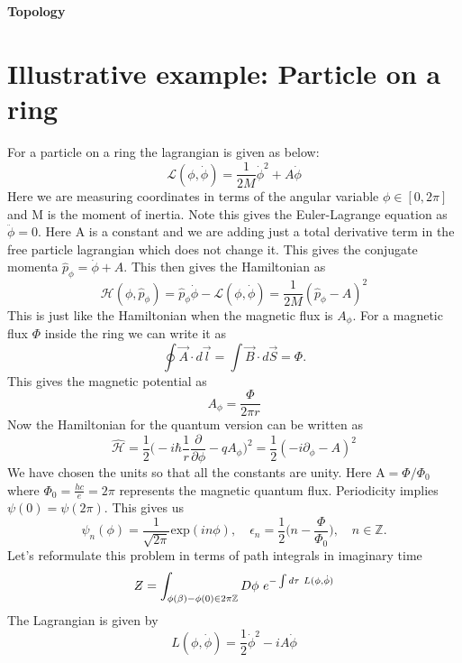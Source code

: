 \documentclass[a4paper, 12pt]{article}
\newcommand{\Zstroke}{%
  \text{\ooalign{\hidewidth\raisebox{0.2ex}{--}\hidewidth\cr$Z$\cr}}%
}
\begin{document}
\begin{center} 
{\Huge{\textbf{Topology}}}\\
\end{center}

\section {Illustrative example: Particle on a ring}
For a particle on a ring the lagrangian is given as below:
\begin{equation}
\mathcal{L}(\phi,\dot{\phi}) = \frac{1}{2M}\dot{\phi}^2 + A\dot{\phi}
\end{equation}
Here we are measuring coordinates in terms of the angular variable $\phi \in [0, 2\pi]$ and M is the moment of inertia. Note this gives the Euler-Lagrange equation as $\ddot{\phi}=0$. Here A is a constant and we are adding just a total derivative term in the free particle lagrangian which does not change it. This gives the conjugate momenta $\hat{p}_{\phi} = \dot{\phi} + A$.  This then gives the Hamiltonian as
\begin{equation}
\mathcal{H}(\phi,\hat{p}_{\phi}) =  \hat{p}_{\phi}\dot{\phi}- \mathcal{L}(\phi,\dot{\phi}) = \frac{1}{2M}(\hat{p}_{\phi} - A)^2
\end{equation}
This is just like the Hamiltonian when the magnetic flux is $A_{\phi}$. For a magnetic flux $\Phi$ inside the ring we can write it as
\begin{equation}
\oint \vec{A} \cdot d\vec{l}=\int \vec{B}\cdot d\vec{S} = \Phi .
\end{equation}
This gives the magnetic potential as
\begin{equation}
A_{\phi} = \frac{\Phi}{2\pi r}
\end{equation}
Now the Hamiltonian for the quantum version can be written as
\begin{equation}
\hat{\mathcal{H}}  = \frac{1}{2}\bigg(-i\hbar\frac{1}{r} \frac{\partial}{\partial\phi}-qA_{\phi} \bigg)^2 = \frac{1}{2}(-i\partial_{\phi}-A)^2 
\end{equation}
We have chosen the units so that all the constants are unity. Here A$= \Phi/\Phi_0$ where $\Phi_0 = \frac{hc}{e} = 2\pi$ represents the magnetic quantum flux. Periodicity implies $\psi(0) = \psi(2\pi)$. This gives us
\begin{equation}
\psi_n(\phi) = \frac{1}{\sqrt{2\pi}}\textrm{exp}(in\phi), \quad \epsilon_n = \frac{1}{2}\bigg(n -\frac{\Phi}{\Phi_0} \bigg), \quad n \in  \mathbb{Z}.
\end{equation}
Let's reformulate this problem in terms of path integrals in imaginary time
\begin{equation}
\Zstroke = \int_{\phi(\beta)-\phi(0) \in 2\pi \mathbb{Z}} D\phi\*\ e^{- \int d\tau \*\ L(\phi,\dot{\phi})}
\end{equation}
The Lagrangian is given by
\begin{equation}
L(\phi,\dot{\phi}) = \frac{1}{2}\dot{\phi}^2 -iA\dot{\phi}
\end{equation}
\end{document}
